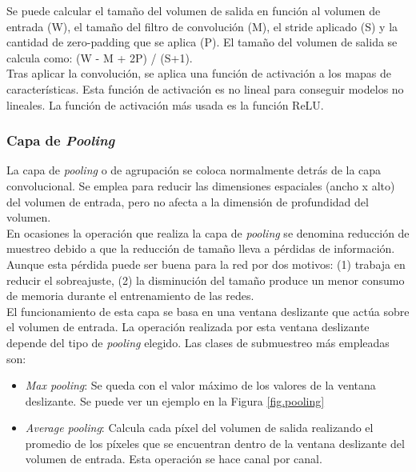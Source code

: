 Se puede calcular el tamaño del volumen de salida en función al volumen de entrada (W), el tamaño del filtro de convolución (M), el stride aplicado (S) y la cantidad de zero-padding que se aplica (P). El tamaño del volumen de salida se calcula como: (W - M + 2P) / (S+1).\\


Tras aplicar la convolución, se aplica una función de activación a los mapas de características. Esta función de activación es no lineal para conseguir modelos no lineales. La función de activación más usada es la función ReLU.


\subsubsection{Capa de \textit{Pooling}}

La capa de \textit{pooling} o de agrupación se coloca normalmente detrás de la capa convolucional. Se emplea para reducir las dimensiones espaciales (ancho x alto) del volumen de entrada, pero no afecta a la dimensión de profundidad del volumen.\\

En ocasiones la operación que realiza la capa de \textit{pooling} se denomina reducción de muestreo debido a que la reducción de tamaño lleva a pérdidas de información. Aunque esta pérdida puede ser buena para la red por dos motivos: (1) trabaja en reducir el sobreajuste, (2) la disminución del tamaño produce un menor consumo de memoria durante el entrenamiento de las redes.\\

El funcionamiento de esta capa se basa en una ventana deslizante que actúa sobre el volumen de entrada. La operación realizada por esta ventana deslizante depende del tipo de \textit{pooling} elegido. Las clases de submuestreo más empleadas son:

\begin{itemize}
    \item \textit{Max pooling}: Se queda con el valor máximo de los valores de la ventana deslizante. Se puede ver un ejemplo en la Figura \ref{fig.pooling}
    
    \item \textit{Average pooling}: Calcula cada píxel del volumen de salida realizando el promedio de los píxeles que se encuentran dentro de la ventana deslizante del volumen de entrada. Esta operación se hace canal por canal.
\end{itemize}

